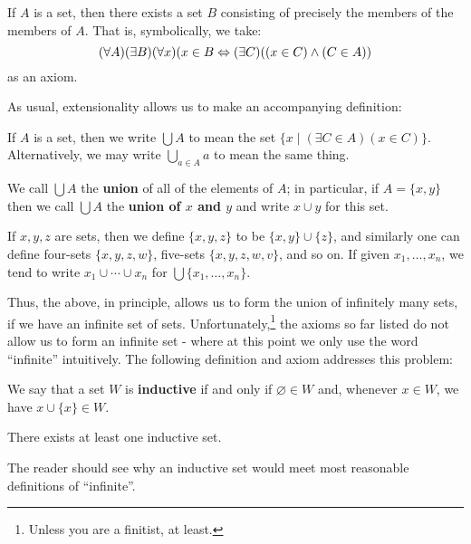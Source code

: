 \begin{axm}
\label{Axiom: Unions}
If $A$ is a set, then there exists a set $B$ consisting of precisely the members of the members of $A$. That is, symbolically, we take:  $$(\forall A)(\exists B)(\forall x)(x\in B \Leftrightarrow (\exists C)((x\in C)\land(C\in A))$$ as an axiom.
\end{axm}

As usual, extensionality allows us to make an accompanying definition: 

\begin{defn}
\label{Defn: Unions of Sets}
If $A$ is a set, then we write $\bigcup A$ to mean the set $\{x\mid (\exists C\in A)(x\in C)\}$. Alternatively, we may write $\bigcup_{a\in A} a$ to mean the same thing. 

We call $\bigcup A$ the \textbf{union} of all of the elements of $A$; in particular, if $A=\{x, y\}$ then we call $\bigcup A$ the \textbf{union of $x$ and $y$} and write $x\cup y$ for this set.
\end{defn}

\begin{defn}
\label{Defn: Small finite sets}
If $x, y, z$ are sets, then we define $\{x, y, z\}$ to be $\{x, y\}\cup\{z\}$, and similarly one can define four-sets $\{x, y, z,w\}$, five-sets $\{x, y, z, w, v\}$, and so on. If given $x_1, \dots, x_n$, we tend to write $x_1\cup\cdots \cup x_n$ for $\bigcup \{x_1, \dots, x_n\}$.
\end{defn}

Thus, the above, in principle, allows us to form the union of infinitely many sets, if we have an infinite set of sets. Unfortunately,\footnote{Unless you are a finitist, at least.} the axioms so far listed do not allow us to form an infinite set - where at this point we only use the word \enquote{infinite} intuitively. The following definition and axiom addresses this problem: 

\begin{defn}
\label{Defn: Inductive Set} 
We say that a set $W$ is \textbf{inductive} if and only if $\varnothing\in W$ and, whenever $x\in W$, we have $x\cup\{x\}\in W$. 
\end{defn}

\begin{axm} 
\label{Axiom: Infinity} 
There exists at least one inductive set. 
\end{axm}

The reader should see why an inductive set would meet most reasonable definitions of \enquote{infinite}.

